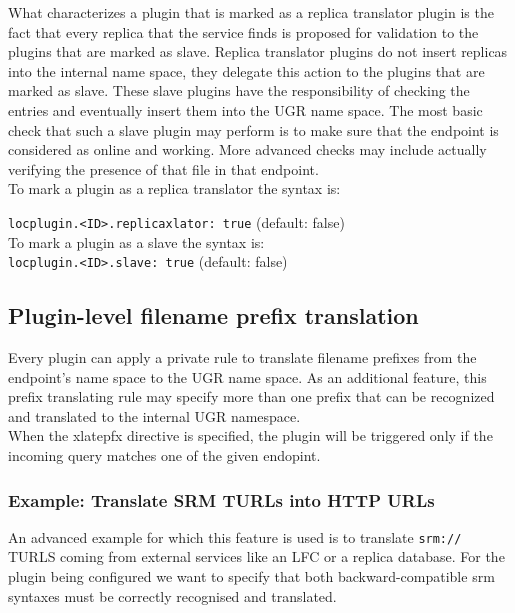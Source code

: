 \documentclass[12pt]{article} %
\begin{document}
What characterizes a plugin that is marked as a replica translator plugin is the fact that every replica that the service finds is proposed for validation to the plugins that are marked as slave. Replica translator plugins do not insert replicas into the internal name space, they delegate this action to the plugins that are marked as slave. These slave plugins have the responsibility of checking the entries and eventually insert them into the UGR name space. The most basic check that such a slave plugin may perform is to make sure that the endpoint is considered as online and working. More advanced checks may include actually verifying the presence of that file in that endpoint.\\

To mark a plugin as a replica translator the syntax is:

\lstinline"locplugin.<ID>.replicaxlator: true" (default: false)\\

To mark a plugin as a slave the syntax is:\\

\lstinline"locplugin.<ID>.slave: true" (default: false)\\




\subsection{Plugin-level filename prefix translation}

Every plugin can apply a private rule to translate filename prefixes from the endpoint's name space to the UGR name space. As an additional feature, this prefix translating rule may specify more than one prefix that can be recognized and translated to the internal UGR namespace.\\

When the xlatepfx directive is specified, the plugin will be triggered only if the incoming query matches one of the given endopint.

\subsubsection{Example: Translate SRM TURLs into HTTP URLs}
An advanced example for which this feature is used is to translate \lstinline"srm://" TURLS coming from external services like an LFC or a replica database. For the plugin being configured we want to specify that both backward-compatible srm syntaxes must be correctly recognised and translated.\\
\end{document}
